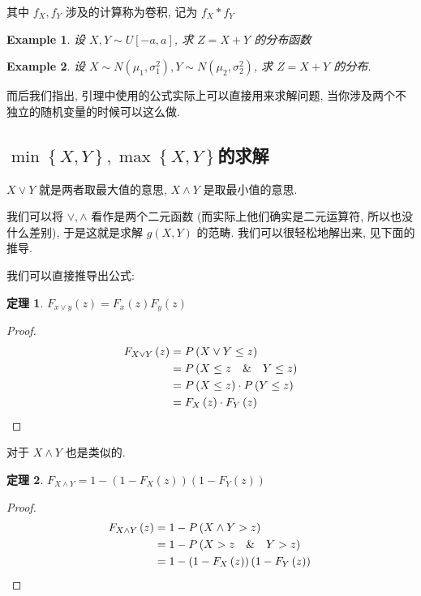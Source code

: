 \documentclass[a4paper, 10pt]{ctexart} %
\newtheorem{theorem}{定理}
\newtheorem{example}{Example}
\begin{document}
其中 $f _{X} , f _{Y}$ 涉及的计算称为卷积, 记为 $f _{X} * f _Y$

\begin{example}
    设 $X , Y \sim U \left[ -a  ,a \right]$, 求 $Z = X + Y$ 的分布函数
\end{example}
\begin{example}
    设 $X \sim N\left( \mu_1, \sigma_1^{2} \right), Y \sim N \left( \mu_2 , \sigma_{2} ^{2}\right)$, 求 $Z = X + Y$ 的分布. 
\end{example}

而后我们指出, 引理中使用的公式实际上可以直接用来求解问题, 当你涉及两个不独立的随机变量的时候可以这么做. 
\subsection{$\min  \left\{ X , Y \right\}, \max \left\{ X, Y\right\} $的求解}
$X \vee Y $ 就是两者取最大值的意思, $X \wedge Y$ 是取最小值的意思. 

我们可以将 $\vee , \wedge$ 看作是两个二元函数 (而实际上他们确实是二元运算符, 所以也没什么差别), 于是这就是求解 $g\left(X, Y\right)$ 
的范畴. 我们可以很轻松地解出来, 见下面的推导.


我们可以直接推导出公式: 
\begin{theorem}
    $F_{x \vee y} \left(z\right) = F_{x} \left(z\right) F_{y} \left(z\right)$  
\end{theorem}
\begin{proof}
\[
\begin{aligned}
F_{ X \vee Y} \left(z\right)  & = P\left( X \vee Y \le z\right)\\
& = P\left(X \le z \quad  \& \quad Y \le z\right)\\
& = P\left( X \le z\right) \cdot P\left(Y\le z\right)\\
& = F_{X } \left(z\right) \cdot  F_{Y} \left(z\right) \qedhere
\end{aligned}
\]
\end{proof}
对于 $X \wedge Y$ 也是类似的. 
\begin{theorem}
    $F_{ X\wedge Y} = 1 - \left(1 - F_{X} \left(z\right) \right) \left(1 -F_{Y} \left(z\right)\right)$
\end{theorem}
\begin{proof}
\[
\begin{aligned}
    F _{X \wedge Y} \left(z\right) & = 1- P\left( X \wedge Y > z\right)\\
    & = 1- P\left( X >z \quad \& \quad Y > z \right) \\
    & = 1 - \left(1 - F_{X} \left(z\right) \right) \left(1 - F_{Y} \left(z\right)\right)\qedhere
\end{aligned}
\]
\end{proof}
\end{document}
